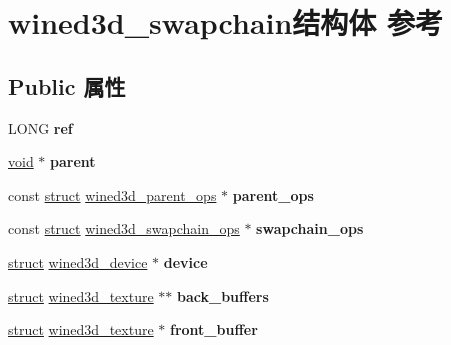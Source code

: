 \hypertarget{structwined3d__swapchain}{}\section{wined3d\+\_\+swapchain结构体 参考}
\label{structwined3d__swapchain}
\subsection*{Public 属性}
\begin{DoxyCompactItemize}
\item 
\mbox{\label{structwined3d__swapchain_a069c82848597ef33e70e8cacf890ae0a}} 
L\+O\+NG {\bfseries ref}
\item 
\mbox{\label{structwined3d__swapchain_a1f0d2720c1cae3c238cbc5af79ac4853}} 
\hyperlink{interfacevoid}{void} $\ast$ {\bfseries parent}
\item 
\mbox{\label{structwined3d__swapchain_ac2968b4b66aaacdb59b401d0057ce224}} 
const \hyperlink{interfacestruct}{struct} \hyperlink{structwined3d__parent__ops}{wined3d\+\_\+parent\+\_\+ops} $\ast$ {\bfseries parent\+\_\+ops}
\item 
\mbox{\label{structwined3d__swapchain_a63016ba325613b7ce3fa6ae0c594044e}} 
const \hyperlink{interfacestruct}{struct} \hyperlink{structwined3d__swapchain__ops}{wined3d\+\_\+swapchain\+\_\+ops} $\ast$ {\bfseries swapchain\+\_\+ops}
\item 
\mbox{\label{structwined3d__swapchain_af7f21ba43aa70faf1cd9ba0c50642587}} 
\hyperlink{interfacestruct}{struct} \hyperlink{structwined3d__device}{wined3d\+\_\+device} $\ast$ {\bfseries device}
\item 
\mbox{\label{structwined3d__swapchain_a00c5b5d49bff595993d080584d1d0425}} 
\hyperlink{interfacestruct}{struct} \hyperlink{structwined3d__texture}{wined3d\+\_\+texture} $\ast$$\ast$ {\bfseries back\+\_\+buffers}
\item 
\mbox{\label{structwined3d__swapchain_a8617fda77da7238b5255be5808a5be37}} 
\hyperlink{interfacestruct}{struct} \hyperlink{structwined3d__texture}{wined3d\+\_\+texture} $\ast$ {\bfseries front\+\_\+buffer}
$$
\end{DoxyCompactItemize}
